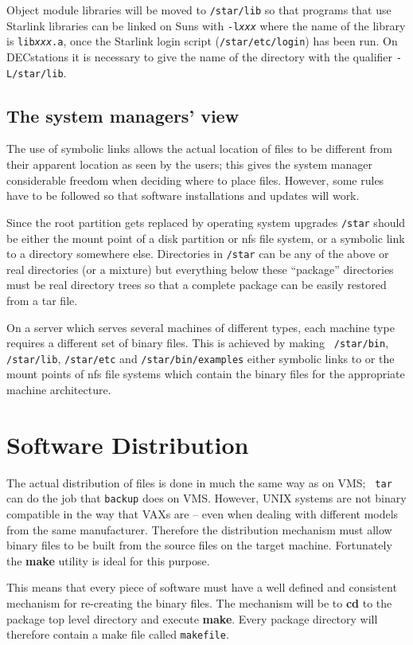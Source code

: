 Object module libraries will be moved to {\tt /star/lib} so that programs that
use Starlink libraries can be linked on Suns with {\tt -l{\em xxx}} where
the name of the library is {\tt lib{\em xxx}.a}, once the Starlink login
script ({\tt /star/etc/login}) has been run. On DECstations it is necessary
to give the name of the directory with the qualifier {\tt -L/star/lib}.

\subsection{The system managers' view}
The use of symbolic links allows the actual location of files to be different
from their apparent location as seen by the users; this gives the system
manager considerable freedom when deciding where to place files. However, some
rules have to be followed so that software installations and updates will
work.

Since the root partition gets replaced by operating system upgrades 
{\tt /star} should be
either the mount point of a disk partition or nfs file system, or a symbolic
link to a directory somewhere else. Directories in {\tt /star} can be any of
the above or real directories (or a mixture) but everything below these
``package'' directories must be real directory trees so that a complete package
can be easily restored from a tar file.

On a server which serves several machines of different types, each machine type
requires a different set of binary files. This is achieved by making {\tt
/star/bin}, {\tt /star/lib}, {\tt /star/etc} and {\tt /star/bin/examples} 
either symbolic links to or the mount points  of nfs file systems which 
contain the binary files for the appropriate machine architecture.
 
\section{Software Distribution}
The actual distribution of files is done in much the same way as on VMS; {\tt 
tar} can do the job that {\tt backup} does on VMS. However, UNIX systems are
not binary compatible in the way that VAXs are -- even when dealing with
different models from the same manufacturer. Therefore the distribution
mechanism must allow binary files to be built from the source files on the
target machine. Fortunately the {\bf make} utility is ideal for this purpose.

This means that every piece of software must have a well defined and consistent
mechanism for re-creating the binary files. The mechanism will be to {\bf cd}
to the package top level directory and execute {\bf make}. Every package
directory will therefore contain a make file called {\tt makefile}.

